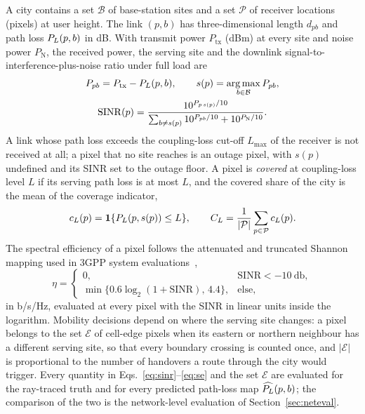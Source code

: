 A city contains a set $\mathcal{B}$ of base-station sites and a set
$\mathcal{P}$ of receiver locations (pixels) at user height. The link
$(p,b)$ has three-dimensional length $d_{pb}$ and path loss $P_{L}(p,b)$ in dB.
With transmit power $P_{\mathrm{tx}}$ (dBm) at every site and noise power
$P_{\mathrm{N}}$, the received power, the serving site and the downlink
signal-to-interference-plus-noise ratio under full load are
\begin{equation}
\begin{gathered}
P_{pb}=P_{\mathrm{tx}}-P_{L}(p,b),\qquad s(p)=\operatorname*{arg\,max}_{b\in\mathcal{B}}P_{pb},\\
\mathrm{SINR}(p)=\frac{10^{P_{p\,s(p)}/10}}
{\sum_{b\neq s(p)}10^{P_{pb}/10}+10^{P_{\mathrm{N}}/10}} .
\end{gathered}
\label{eq:sinr}
\end{equation}
A link whose path loss exceeds the coupling-loss cut-off $L_{\max}$ of the
receiver is not received at all; a pixel that no site reaches is an outage
pixel, with $s(p)$ undefined and its SINR set to the outage floor. A pixel is
\emph{covered} at coupling-loss level $L$ if its serving path loss is at
most $L$, and the covered share of the city is the mean of the coverage
indicator,
\begin{equation}
c_L(p)=\mathbf{1}\{P_{L}(p,s(p))\le L\},\qquad
C_L=\frac{1}{|\mathcal{P}|}\sum_{p\in\mathcal{P}}c_L(p).
\label{eq:coverage}
\end{equation}
The spectral efficiency of a pixel follows the attenuated and truncated
Shannon mapping used in 3GPP system evaluations~\cite{tr36942},
\begin{equation}
\eta=\begin{cases}
0, & \mathrm{SINR}<\SI{-10}{\decibel},\\
\min\{0.6\log_{2}(1+\mathrm{SINR}),\,4.4\}, & \text{else},
\end{cases}
\label{eq:se}
\end{equation}
in b/s/Hz, evaluated at every pixel with the SINR in linear units inside
the logarithm. Mobility
decisions depend on where the serving site changes: a pixel belongs to the
set $\mathcal{E}$ of cell-edge pixels when its eastern or northern
neighbour has a different serving site, so that every boundary crossing is
counted once, and $|\mathcal{E}|$ is proportional to the number of handovers
a route through the city would trigger. Every quantity in
Eqs.~\eqref{eq:sinr}--\eqref{eq:se} and the set $\mathcal{E}$ are evaluated
for the ray-traced truth and for every predicted path-loss map
$\widehat{P_{L}}(p,b)$; the comparison of the two is the network-level
evaluation of Section~\ref{sec:neteval}.

